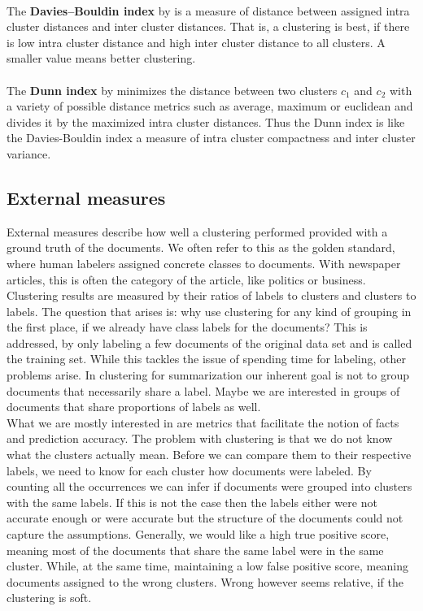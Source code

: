     \paragraph{} The \textbf{Davies–Bouldin index} by \cite{DavisBouldin1979} is a measure of distance between assigned intra cluster distances and inter cluster distances. That is, a clustering is best, if there is low intra cluster distance and high inter cluster distance to all clusters. A smaller value means better clustering.

    \paragraph{} The \textbf{Dunn index} by \cite{DunnIndex1973} minimizes the distance between two clusters $c_1$ and $c_2$ with a variety of possible distance metrics such as average, maximum or euclidean and divides it by the maximized intra cluster distances. Thus the Dunn index is like the Davies-Bouldin index a measure of intra cluster compactness and inter cluster variance.

  \subsection{External measures}
  \label{sec:external_measures}

    External measures describe how well a clustering performed provided with a ground truth of the documents. We often refer to this as the golden standard, where human labelers assigned concrete classes to documents. With newspaper articles, this is often the category of the article, like politics or business. Clustering results are measured by their ratios of labels to clusters and clusters to labels. The question that arises is: why use clustering for any kind of grouping in the first place, if we already have class labels for the documents? This is addressed, by only labeling a few documents of the original data set and is called the training set. While this tackles the issue of spending time for labeling, other problems arise. In clustering for summarization our inherent goal is not to group documents that necessarily share a label. Maybe we are interested in groups of documents that share proportions of labels as well.\\

    What we are mostly interested in are metrics that facilitate the notion of facts and prediction accuracy. The problem with clustering is that we do not know what the clusters actually mean. Before we can compare them to their respective labels, we need to know for each cluster how documents were labeled. By counting all the occurrences we can infer if documents were grouped into clusters with the same labels. If this is not the case then the labels either were not accurate enough or were accurate but the structure of the documents could not capture the assumptions. Generally, we would like a high true positive score, meaning most of the documents that share the same label were in the same cluster. While, at the same time, maintaining a low false positive score, meaning documents assigned to the wrong clusters. Wrong however seems relative, if the clustering is soft.


